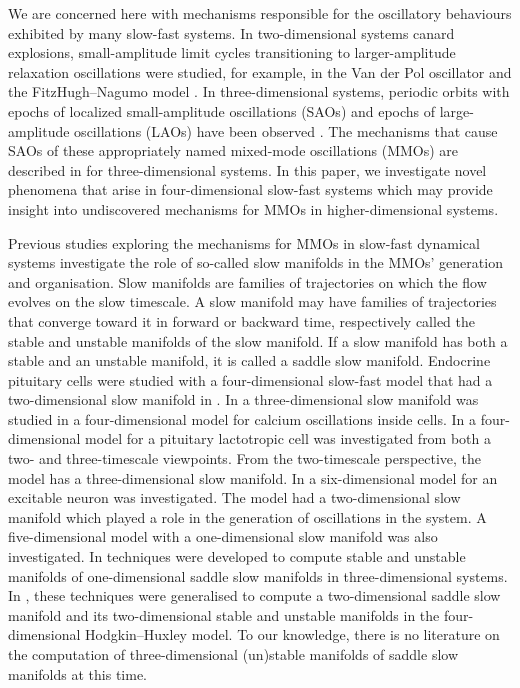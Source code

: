 \documentclass{ws-ijbc}
\begin{document}
We are concerned here with mechanisms responsible for the oscillatory behaviours exhibited by many slow-fast systems.  In two-dimensional systems canard explosions, small-amplitude limit cycles transitioning to larger-amplitude relaxation oscillations were studied, for example, in the Van der Pol oscillator and the FitzHugh--Nagumo model \cite{canard_explosion, fitz-hugh-nagumo}.  In three-dimensional systems, periodic orbits with epochs of localized small-amplitude oscillations (SAOs) and epochs of large-amplitude oscillations (LAOs) have been observed \cite{BZ}.  The mechanisms that cause SAOs of these appropriately named mixed-mode oscillations (MMOs) are described in \cite{MMO} for three-dimensional systems.  In this paper, we investigate novel phenomena that arise in four-dimensional slow-fast systems which may provide insight into undiscovered mechanisms for MMOs in higher-dimensional systems.

Previous studies exploring the mechanisms for MMOs in slow-fast dynamical systems investigate the role of so-called slow manifolds in the MMOs' generation and organisation.  Slow manifolds are families of trajectories on which the flow evolves on the slow timescale.  A slow manifold may have families of trajectories that converge toward it in forward or backward time, respectively called the stable and unstable manifolds of the slow manifold.  If a slow manifold has both a stable and an unstable manifold, it is called a saddle slow manifold.  Endocrine pituitary cells were studied with a four-dimensional slow-fast model that had a two-dimensional slow manifold in \cite{Vo_paper2}.  In \cite{Emily_Harvey_paper} a three-dimensional slow manifold was studied in a four-dimensional model for calcium oscillations inside cells. In \cite{Vo_paper} a four-dimensional model for a pituitary lactotropic cell was investigated from both a two- and three-timescale viewpoints.  From the two-timescale perspective, the model has a three-dimensional slow manifold.  In \cite{Martin_neuron_paper} a six-dimensional model for an excitable neuron was investigated.  The model had a two-dimensional slow manifold which played a role in the generation of oscillations in the system.  A five-dimensional model with a one-dimensional slow manifold was also investigated.  In \cite{Saeed_Paper} techniques were developed to compute stable and unstable manifolds of one-dimensional saddle slow manifolds in three-dimensional systems. In \cite{Cris_paper}, these techniques were generalised to compute a two-dimensional saddle slow manifold and its two-dimensional stable and unstable manifolds in the four-dimensional Hodgkin--Huxley model.  To our knowledge, there is no literature on the computation of three-dimensional (un)stable manifolds of saddle slow manifolds at this time.
\end{document}

